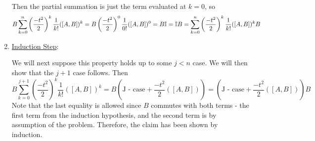 \begin{solution}
\begin{enumerate}[-]
        \hop
        Then the partial summation is just the term evaluated at $k = 0$, so 
        \[B \sum_{k=0}^n \left(\frac{-t^2}{2}\right)^k\frac{1}{k!}([A, B])^k = B \left(\frac{-t^2}{2}\right)^0\frac{1}{0!}([A, B])^0 = B\mathbb{I} = \mathbb{I} B =  \sum_{k=0}^n \left(\frac{-t^2}{2}\right)^k\frac{1}{k!}([A, B])^kB\]

        \item \underline{Induction Step}: 

        \hop We will next suppose this property holds up to some $j< n$ case. We will then show that the $j+1$ case follows. Then 
        \[B \sum_{k=0}^{j+1} \left(\frac{-t^2}{2}\right)^k\frac{1}{k!}([A, B])^k = B\left( \text{J - case} + \frac{-t^2}{2}([A, B])\right) = \left( \text{J - case} + \frac{-t^2}{2}([A, B])\right)B \]
        Note that the last equality is allowed since $B$ commutes with both terms - the first term from the induction hypothesis, and the second term is by assumption of the problem. Therefore, the claim has been shown by induction.
    \end{enumerate}
    \vspace{-6mm}\alignbreak


\end{solution}
